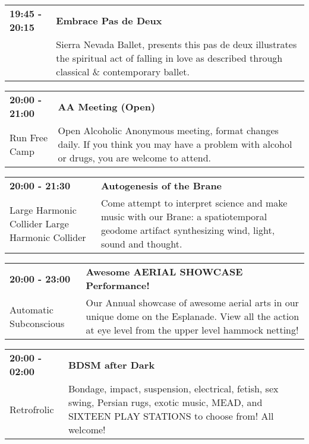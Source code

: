 \begin{tabular}{ p{1in} p{2.2in} }
    \textbf{19:45 - 20:15} & \textbf{Embrace Pas de Deux} \\
    ~ \newline  & Sierra Nevada Ballet, presents this pas de deux illustrates the spiritual act of falling in love as described through classical \& contemporary ballet. \\
    \hline 
\end{tabular}
    
\begin{tabular}{ p{1in} p{2.2in} }
    \textbf{20:00 - 21:00} & \textbf{AA Meeting (Open)} \\
    Run Free Camp \newline  & Open Alcoholic Anonymous meeting, format changes daily. If you think you may have a problem with alcohol or drugs, you are welcome to attend. \\
    \hline 
\end{tabular}
    
\begin{tabular}{ p{1in} p{2.2in} }
    \textbf{20:00 - 21:30} & \textbf{Autogenesis of the Brane} \\
    Large Harmonic Collider \newline Large Harmonic Collider & Come attempt to interpret science and make music with our Brane: a spatiotemporal geodome artifact synthesizing wind, light, sound and thought. \\
    \hline 
\end{tabular}
    
\begin{tabular}{ p{1in} p{2.2in} }
    \textbf{20:00 - 23:00} & \textbf{Awesome AERIAL SHOWCASE Performance!} \\
    Automatic Subconscious \newline  & Our Annual showcase of awesome aerial arts in our unique dome on the Esplanade. View all the action at eye level from the upper level hammock netting! \\
    \hline 
\end{tabular}
    
\begin{tabular}{ p{1in} p{2.2in} }
    \textbf{20:00 - 02:00} & \textbf{BDSM after Dark} \\
    Retrofrolic \newline  & Bondage, impact, suspension, electrical, fetish, sex swing, Persian rugs, exotic music, MEAD, and SIXTEEN PLAY STATIONS to choose from! All welcome! \\
    \hline 
\end{tabular}
    
